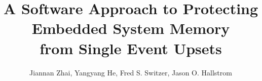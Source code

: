 \documentclass{acm_proc_article-sp}
\begin{document}
\date{}

\title{\Large \bf A Software Approach to Protecting Embedded System Memory\\ from Single Event Upsets}

%
%
%
%
%


%
\author{
%
%
 \alignauthor Jiannan Zhai, Yangyang He, Fred S. Switzer, Jason O. Hallstrom\\
    \\
    \\
}
\end{document}
